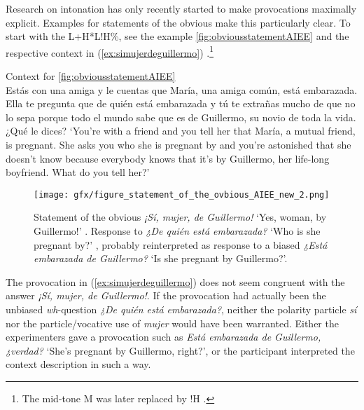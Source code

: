 Research on intonation has only recently started to make provocations maximally explicit. Examples for statements of the obvious make this particularly clear. To start with the L+H*L!H\%, see the example \autoref{fig:obviousstatementAIEE} and the respective context in (\ref{ex:simujerdeguillermo}) \citep{PrietoRoseano2009encuestacastilia}.\footnote{The mid-tone M was later replaced by !H \citep[362]{HualdePrieto2015}.}

\begin{exe}
	\ex\label{ex:simujerdeguillermo} Context for \autoref{fig:obviousstatementAIEE} \\
	Estás con una amiga y le cuentas que María, una amiga común, está embarazada. Ella te pregunta que de quién está embarazada y tú te extrañas mucho de que no lo sepa porque todo el mundo sabe que es de Guillermo, su novio de toda la vida. ¿Qué le dices? 
	\glt ‘You're with a friend and you tell her that María, a mutual friend, is pregnant. She asks you who she is pregnant by and you're astonished that she doesn't know because everybody knows that it's by Guillermo, her life-long boyfriend. What do you tell her?’ 
\end{exe}



\begin{figure}
\texttt{[image: gfx/figure\_statement\_of\_the\_ovbious\_AIEE\_new\_2.png]}
\caption[Obvious declarative \textit{¡Sí, mujer, de Guillermo!}]{Statement of the 
	obvious \textit{¡Sí, mujer, de Guillermo!} `Yes, woman, by Guillermo!' 
	\citep{Prieto2009-2013}. Response to \textit{¿De quién está embarazada?} 
	`Who is she pregnant by?' \citep{PrietoRoseano2009encuestacastilia}, 
	probably reinterpreted as response to a biased \textit{¿Está embarazada de 
		Guillermo?} `Is she pregnant by 
	Guillermo?'.  \href{http://prosodia.upf.edu/atlasentonacion/enquestes/espanol/madrid/frases/mp3/10.mp3}{\faVolumeUp} \href{http://prosodia.upf.edu/atlasentonacion/enquestes/espanol/madrid/index.html}{\faExternalLink*}} \label{fig:obviousstatementAIEE}
\bigskip
\end{figure}

The provocation in (\ref{ex:simujerdeguillermo}) does not seem congruent with the answer \textit{¡Sí, mujer, de Guillermo!}. If the provocation had actually been the unbiased \textit{wh}-question \textit{¿De quién está embarazada?}, neither the polarity particle \textit{sí} nor the particle/vocative use of \textit{mujer} would have been warranted. Either the experimenters gave a provocation such as \textit{Está embarazada de Guillermo, ¿verdad?} `She's pregnant by Guillermo, right?', or the participant interpreted the context description in such a way.

